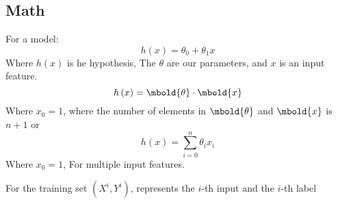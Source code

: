 \documentclass[12pt letter]{report}
\begin{document}

\subsection{Math}
For a model:
\[
  h \left( x \right)  = \theta_0 + \theta_1 x
\]
Where $h \left( x\right) $ is he hypothesis, The $\theta$ are our parameters, and $x$ is an input feature.
\[
  h \left( x \right) = \mbold{\theta} \cdot \mbold{x}
\]
Where $x_0 = 1$, where the number of elements in $\mbold{\theta}$ and $\mbold{x}$ is $n+1$ or
\[
  h \left( x \right) = \displaystyle\sum_{i = 0}^{n} \theta_i x_i
\]
Where $x_0 = 1$, For multiple input features.

For the training set $ \left( X^i, Y^i\right) $, represents the $i$-th input and the  $i$-th label
\end{document}
